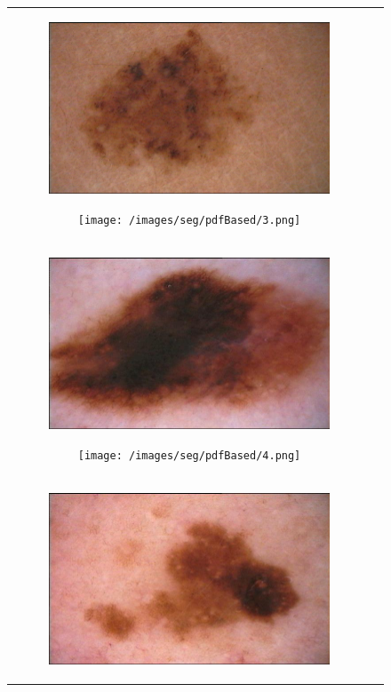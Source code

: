 \documentclass[a4paper, 10pt, conference]{ieeeconf}        %
\begin{document}
\begin{figure}[ht!]
\begin{tabular}{c c}
\begin{subfigure}{0.2\textwidth}
  \includegraphics[scale=0.15]{original03.JPG}\caption{}
  \end{subfigure}
  \begin{subfigure}{0.2\textwidth}
  \texttt{[image: /images/seg/pdfBased/3.png]}\caption{}
  \end{subfigure}\\
 \begin{subfigure}{0.2\textwidth}
  \includegraphics[scale=0.15]{original04.JPG}\caption{}
  \end{subfigure}
  \begin{subfigure}{0.2\textwidth}
  \texttt{[image: /images/seg/pdfBased/4.png]}\caption{}
  \end{subfigure}\\
 \begin{subfigure}{0.2\textwidth}
 \includegraphics[scale=0.15]{original05.JPG}\caption{}

\end{subfigure}
\end{tabular}
\end{figure}
\end{document}
